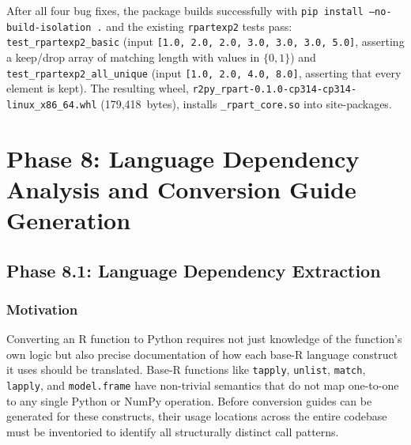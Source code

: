 \documentclass[12pt]{article}
\begin{document}
After all four bug fixes, the package builds successfully with \texttt{pip install --no-build-isolation .} and the existing \texttt{rpartexp2} tests pass: \texttt{test\_rpartexp2\_basic} (input \texttt{[1.0, 2.0, 2.0, 3.0, 3.0, 3.0, 5.0]}, asserting a keep/drop array of matching length with values in $\{0,1\}$) and \texttt{test\_rpartexp2\_all\_unique} (input \texttt{[1.0, 2.0, 4.0, 8.0]}, asserting that every element is kept). The resulting wheel, \texttt{r2py\_rpart-0.1.0-cp314-cp314-linux\_x86\_64.whl} (179{,}418~bytes), installs \texttt{\_rpart\_core.so} into site-packages.

\section{Phase 8: Language Dependency Analysis and Conversion Guide Generation}
\label{sec:phase8}

\subsection{Phase 8.1: Language Dependency Extraction}
\label{sec:phase8.1}

\subsubsection{Motivation}

Converting an R function to Python requires not just knowledge of the function's own logic but also precise documentation of how each base-R language construct it uses should be translated. Base-R functions like \texttt{tapply}, \texttt{unlist}, \texttt{match}, \texttt{lapply}, and \texttt{model.frame} have non-trivial semantics that do not map one-to-one to any single Python or NumPy operation. Before conversion guides can be generated for these constructs, their usage locations across the entire codebase must be inventoried to identify all structurally distinct call patterns.
\end{document}
